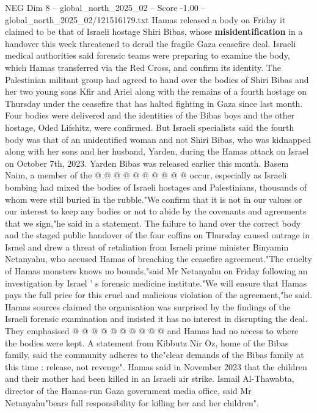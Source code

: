 \begin{textsample}{NEG Dim 8 – global\_north\_2025\_02 – Score -1.00 – global\_north\_2025\_02/121516179.txt}  \label{ex:f8_neg_431}
Hamas released a body on Friday it claimed to be that of Israeli hostage Shiri Bibas, whose \textbf{misidentification} in a handover this week threatened to derail the fragile Gaza ceasefire deal.
Israeli medical authorities said forensic teams were preparing to examine the body, which Hamas transferred via the Red Cross, and confirm its identity.
The Palestinian militant group had agreed to hand over the bodies of Shiri Bibas and her two young sons Kfir and Ariel along with the remains of a fourth hostage on Thursday under the ceasefire that has halted fighting in Gaza since last month.
Four bodies were delivered and the identities of the Bibas boys and the other hostage, Oded Lifshitz, were confirmed.
But Israeli specialists said the fourth body was that of an unidentified woman and not Shiri Bibas, who was kidnapped along with her sons and her husband, Yarden, during the Hamas attack on Israel on October 7th, 2023.
Yarden Bibas was released earlier this month.
Basem Naim, a member of the @ @ @ @ @ @ @ @ @ @ occur, especially as Israeli bombing had mixed the bodies of Israeli hostages and Palestinians, thousands of whom were still buried in the rubble."We confirm that it is not in our values or our interest to keep any bodies or not to abide by the covenants and agreements that we sign,"he said in a statement.
The failure to hand over the correct body and the staged public handover of the four coffins on Thursday caused outrage in Israel and drew a threat of retaliation from Israeli prime minister Binyamin Netanyahu, who accused Hamas of breaching the ceasefire agreement."The cruelty of Hamas monsters knows no bounds,"said Mr Netanyahu on Friday following an investigation by Israel ' s forensic medicine institute."We will ensure that Hamas pays the full price for this cruel and malicious violation of the agreement,"he said.
Hamas sources claimed the organisation was surprised by the findings of the Israeli forensic examination and insisted it has no interest in disrupting the deal.
They emphasised @ @ @ @ @ @ @ @ @ @ and Hamas had no access to where the bodies were kept.
A statement from Kibbutz Nir Oz, home of the Bibas family, said the community adheres to the"clear demands of the Bibas family at this time : release, not revenge".
Hamas said in November 2023 that the children and their mother had been killed in an Israeli air strike.
Ismail Al-Thawabta, director of the Hamas-run Gaza government media office, said Mr Netanyahu"bears full responsibility for killing her and her children".

\end{textsample}
